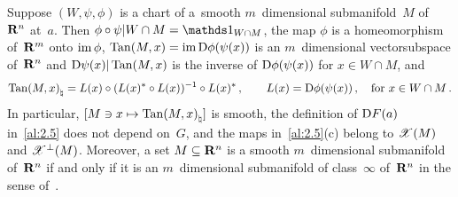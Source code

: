 \begin{lemma}[new]
    \label{new:charts}
    Suppose $(W,\psi,\phi)$ is a chart of a~smooth $m$~dimensional submanifold~$M$
    of~$\mathbf{R}^{n}$ at~$a$. Then $\phi \circ \psi | W \cap M = \id{W \cap M}$, the map $\phi$ is
    a homeomorphism of~$\mathbf{R}^m$ onto $\operatorname{im} \phi$, $\operatorname{Tan}(M,x) = \operatorname{im} \mathrm{D} \phi(\psi(x))$ is an
    $m$~dimensional vectorsubspace of~$\mathbf{R}^{n}$ and $\mathrm{D} \psi(x) | \operatorname{Tan}(M,x)$ is the inverse
    of $\mathrm{D} \phi(\psi(x))$ for $x \in W \cap M$, and
    \begin{displaymath}
        {\operatorname{Tan}(M,x)}_\natural = L(x) \circ (L(x)^{*} \circ L(x))^{-1} \circ
        L(x)^{*} \,, \qquad L(x) = \mathrm{D} \phi(\psi(x)) \,,
        \quad \text{for $x \in W \cap M$} \,.
    \end{displaymath}
    In particular, $[M \ni x \mapsto {\operatorname{Tan}(M,x)}_\natural]$ is smooth, the definition of
    $\mathrm{D} F(a)$ in~\ref{al:2.5} does not depend on~$G$, and the maps in~\ref{al:2.5}(c) belong to
    $\mathscr{X}(M)$ and $\mathscr{X}^\perp(M)$. Moreover, a set $M \subseteq \mathbf{R}^{n}$ is a smooth
    $m$~dimensional submanifold of~$\mathbf{R}^{n}$ if and only if it is an $m$~dimensional
    submanifold of class~$\infty$ of~$\mathbf{R}^{n}$ in the sense of~\cite[3.1.19]{Federer1969}.
\end{lemma}

